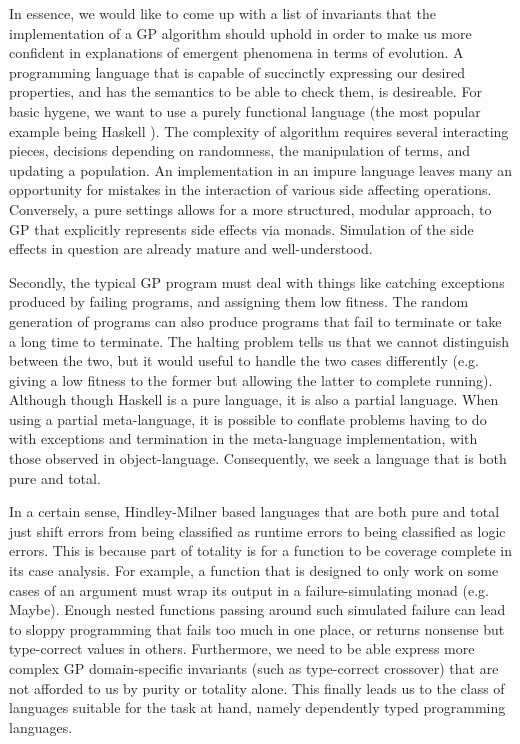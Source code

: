 \documentclass{acm_proc_article-sp}
\begin{document}
In essence, we would like to come up with a list of invariants that
the implementation of a GP algorithm should uphold in order to make us
more confident in explanations of emergent phenomena in terms of
evolution. A programming language that is capable of succinctly
expressing our desired properties, and has the semantics to be able to
check them, is desireable. For basic hygene, we want to use a purely
functional language (the most popular example being Haskell
\cite{spj:haskell}). The complexity of algorithm requires several
interacting pieces, decisions depending on randomness, the
manipulation of terms, and updating a population. An implementation in
an impure language leaves many an opportunity for mistakes in the
interaction of various side affecting operations. Conversely, a pure
settings allows for a more structured, modular approach, to GP that
explicitly represents side effects via monads. Simulation of the side
effects in question are already mature and well-understood.

Secondly, the typical GP program must deal with things like catching
exceptions produced by failing programs, and assigning them low
fitness. The random generation of programs can also produce programs
that fail to terminate or take a long time to terminate. The halting
problem tells us that we cannot distinguish between the
two, but it would useful to handle the two cases differently
(e.g. giving a low fitness to the former but allowing the latter to
complete running). Although though Haskell is a pure language, it is
also a partial language. When using a partial meta-language, it is
possible to conflate problems having to do with exceptions and
termination in the meta-language implementation, with those observed
in object-language. Consequently, we seek a language that is both pure
and total.

In a certain sense, Hindley-Milner based languages that are both pure
and total just shift errors from being classified as runtime errors to
being classified as logic errors. This is because part of totality is
for a function to be coverage complete in its case analysis. For
example, a function that is designed to only work on some cases of an
argument must wrap its output in a failure-simulating monad
(e.g. Maybe). Enough nested functions passing around such simulated
failure can lead to sloppy programming that fails too much in one
place, or returns nonsense but type-correct values in
others. Furthermore, we need to be able express more complex GP
domain-specific invariants (such as type-correct crossover) that are
not afforded to us by purity or totality alone. This finally leads us
to the class of languages suitable for the task at hand, namely
dependently typed programming languages.
\end{document}
